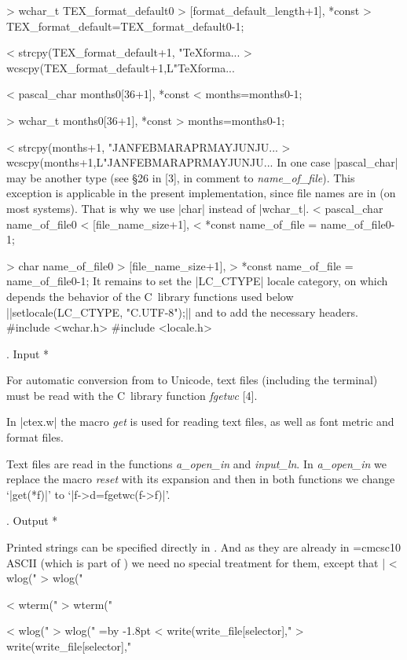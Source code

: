 > wchar_t TEX_format_default0
>   [format_default_length+1], *const
> TEX_format_default=TEX_format_default0-1;

< strcpy(TEX_format_default+1, "TeXforma...
> wcscpy(TEX_format_default+1,L"TeXforma...

< pascal_char months0[36+1], *const
<   months=months0-1;

> wchar_t months0[36+1], *const 
>   months=months0-1;

< strcpy(months+1, "JANFEBMARAPRMAYJUNJU...
> wcscpy(months+1,L"JANFEBMARAPRMAYJUNJU...
\endverbatim
In one case |pascal_char| may be another type
(see \S26 in [3], in comment to {\it name\_of\_file\/}).
This exception is applicable in the present implementation,
since file names are in  (on most systems).
That is why we use |char| instead of |wchar_t|.
\verbatim
< pascal_char name_of_file0
<             [file_name_size+1],
<   *const name_of_file = name_of_file0-1;

> char name_of_file0
>      [file_name_size+1],
>   *const name_of_file = name_of_file0-1;
\endverbatim
\medskip
It remains to set the |LC_CTYPE| locale category, on which
depends the behavior of the C~library functions used below
||setlocale(LC_CTYPE, "C.UTF-8");||
and to add the necessary headers.
\verbatim
#include <wchar.h>
#include <locale.h>
\endverbatim

. Input *

For automatic conversion from  to Unicode,
text files (including the terminal) must be
read with the C~library function \hbox{\it fgetwc\/} [4].

In |ctex.w| the macro {\it get\/}
is used for reading text files, as well as
font metric and format files.

Text files are read in the functions
{\it a\_open\_in\/} and
{\it input\_ln\/}.
In
{\it a\_open\_in\/} we replace the macro
{\it reset\/}
with its expansion and then in both functions
we change `|get(*f)|' to `|f->d=fgetwc(f->f)|'.

. Output *

Printed strings can be specified directly in .
And as they are already in {\font\rm=cmcsc10 \rm ASCII} (which is
part of )
we need no special treatment for them,
except that |%
\verbatim
< wlog("%c",months[k]);
> wlog("%lc",months[k]);

< wterm("%c",xchr[s]);
> wterm("%lc",xchr[s]);

< wlog("%c",xchr[s]);
> wlog("%lc",xchr[s]);
\endverbatim
\begingroup
\everyverbatim={\advance\parindent by -1.8pt }
\verbatim
< write(write_file[selector],"%c",xchr[s]);
> write(write_file[selector],"%lc",xchr[s]);
\endverbatim
\endgroup

